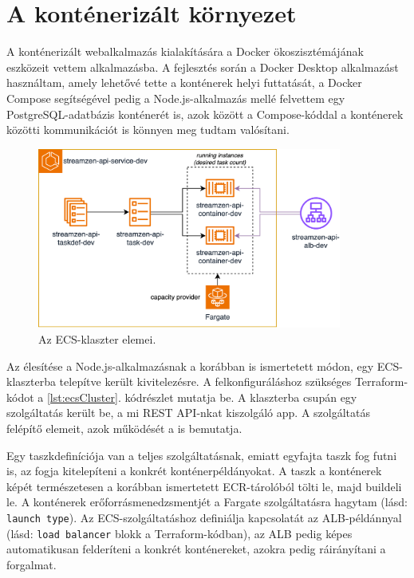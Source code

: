 \section{A konténerizált környezet}

A konténerizált webalkalmazás kialakítására a Docker ökoszisztémájának eszközeit vettem alkalmazásba. A fejlesztés során a Docker Desktop alkalmazást használtam, amely lehetővé tette a konténerek helyi futtatását, a Docker Compose segítségével pedig a Node.js-alkalmazás mellé felvettem egy PostgreSQL-adatbázis konténerét is, azok között a Compose-kóddal a konténerek közötti kommunikációt is könnyen meg tudtam valósítani.

\begin{figure}[h]
  \centering
  \includegraphics[width=100mm, keepaspectratio]{figures/dipterv_ecs.png}
  \caption{Az ECS-klaszter elemei.}
  \label{fig:ecscluster}
\end{figure}

Az élesítése a Node.js-alkalmazásnak a korábban is ismertetett módon, egy ECS-klaszterba telepítve került kivitelezésre. A felkonfiguráláshoz szükséges Terraform-kódot a \ref{lst:ecsCluster}. kódrészlet mutatja be. A klaszterba csupán egy szolgáltatás került be, a mi REST API-nkat kiszolgáló app. A szolgáltatás felépítő elemeit, azok működését a  is bemutatja.

Egy taszkdefiníciója van a teljes szolgáltatásnak, emiatt egyfajta taszk fog futni is, az fogja kitelepíteni a konkrét konténerpéldányokat. A taszk a konténerek képét természetesen a korábban ismertetett ECR-tárolóból tölti le, majd buildeli le. A konténerek erőforrásmenedzsmentjét a Fargate szolgáltatásra hagytam (lásd: \verb|launch type|). Az ECS-szolgáltatáshoz definiálja kapcsolatát az ALB-példánnyal (lásd: \verb|load balancer| blokk a Terraform-kódban), az ALB pedig képes automatikusan felderíteni a konkrét konténereket, azokra pedig ráirányítani a forgalmat.

